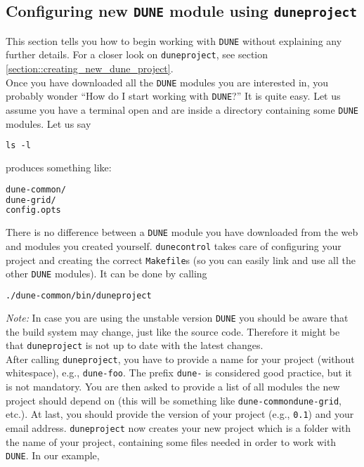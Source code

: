 \documentclass[11pt,a4paper,headinclude,footinclude,DIV16,normalheadings]{scrartcl}
\newcommand{\dune}{\texttt{DUNE}\xspace}
\newcommand{\dunecommon}{\texttt{dune-common}\xspace}
\newcommand{\dunegrid}{\texttt{dune-grid}\xspace}
\newcommand{\dunecontrol}{\texttt{dunecontrol}\xspace}
\newcommand{\duneproject}{\texttt{duneproject}\xspace}
\begin{document}
\subsection{Configuring new \dune module using \duneproject}\label{section::creating_dune_module}

This section tells you how to begin working with \dune without explaining any
further details. For a closer look on \duneproject, see section
\ref{section::creating_new_dune_project}.\\

Once you have downloaded all the \dune modules you are interested in, you probably
wonder ``How do I start working with \dune?'' It is quite easy.
Let us assume you have a terminal open and are inside a directory containing
some \dune modules. Let us say
 
\begin{lstlisting}[language=make]
ls -l
\end{lstlisting}
produces something like:

\begin{lstlisting}[language=make]
dune-common/
dune-grid/
config.opts
\end{lstlisting}

There is no difference between a \dune module you have downloaded from
the web and modules you created yourself.
\dunecontrol takes care of configuring your project and creating the
correct \texttt{Makefile}s (so you can easily link and use all the other \dune
modules). It can be done by calling
 
\begin{lstlisting}[language=make]
./dune-common/bin/duneproject
\end{lstlisting}

\emph{Note:} In case you are using the unstable version
\dune you should be aware that the build system may change,
just like the source code. Therefore it might be that
\texttt{duneproject} is not up to date with the latest changes. \\

After calling \duneproject, you have to provide a name for your project
(without whitespace), e.g., \texttt{dune-foo}. 
The prefix \texttt{dune-} is considered good practice, but it is not
mandatory.
You are then asked to provide a
list of all modules the new project should depend on (this will be
something like \dunecommon \dunegrid, etc.). At last, you should provide
the version of your project (e.g., \texttt{0.1}) and your email address.
\duneproject now creates your new project which is a folder with the name of your project,
containing some files needed in order to work with \dune.
In our example,
 
\end{document}
